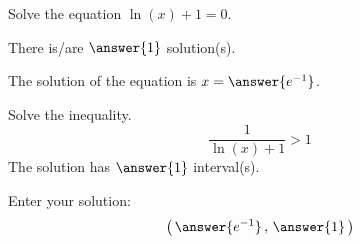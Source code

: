 \documentclass{ximera}
\author{Bobby Ramsey}
\begin{document}
\begin{exercise}
	Solve the equation $\ln(x) + 1 = 0$.

	There is/are $\answer{1}$ solution(s).
	\begin{exercise}
		The solution of the equation is $x = \answer{e^{-1}}$.
	

		\begin{exercise}
			Solve the inequality.
			\[ \frac{1}{\ln(x)+1} > 1 \]
			The solution has $\answer{1}$ interval(s).
	
			\begin{exercise}
				Enter your solution:
				\[ \left( \, \answer{e^{-1}} \, , \, \answer{1} \, \right) \]
			\end{exercise}
		\end{exercise}
	\end{exercise}
\end{exercise}
\end{document}
